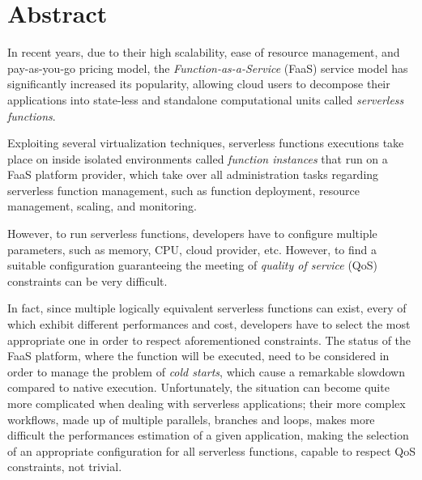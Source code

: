 \documentclass[12pt,a4paper]{report}
\begin{document}
\begin{frontespizio} 
	
\end{frontespizio} 
	
\chapter*{Abstract}
	
In recent years, due to their high scalability, ease of resource management, and pay-as-you-go pricing model, the \textit{Function-as-a-Service} (FaaS) service model has significantly increased its popularity, allowing cloud users to decompose their applications into state-less and standalone computational units called \textit{serverless functions}.

Exploiting several virtualization techniques, serverless functions executions take place on inside isolated environments called \textit{function instances} that run on a FaaS platform provider, which take over all administration tasks regarding serverless function management, such as function deployment, resource management, scaling, and monitoring. 

However, to run serverless functions, developers have to configure multiple parameters, such as memory, CPU, cloud provider, etc. However, to find a suitable configuration guaranteeing the meeting of \textit{quality of service} (QoS) constraints can be very difficult.

In fact, since multiple logically equivalent serverless functions can exist, every of which exhibit different performances and cost, developers have to select the most appropriate one in order to respect aforementioned constraints. The status of the FaaS platform, where the function will be executed, need to be considered in order to manage the problem of \textit{cold starts}, which cause a remarkable slowdown compared to native execution. Unfortunately, the situation can become quite more complicated when dealing with serverless applications; their more complex workflows, made up of multiple parallels, branches and loops, makes more difficult the performances estimation of a given application, making the selection of an appropriate configuration for all serverless functions, capable to respect QoS constraints, not trivial.
\end{document}
